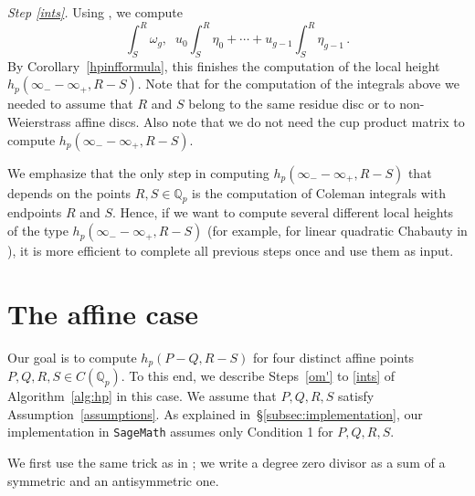 \documentclass[11pt, a4paper]{amsart}
\newcommand{\Q}{\mathbb{Q}}
\theoremstyle{remark}
\numberwithin{equation}{section}
\newcommand{\sg}{{}}
\newcommand{\sm}{{}}
\begin{document}
{\it Step \eqref{ints}.} 
Using \cite{Jen-Even-Degree-CI}, we compute 
\[
\int_S^R \omega_g,\;\; u_0\int_S^R\eta_0+\cdots+u_{g-1}\int_S^R\eta_{g-1}\,.
\]
\sm{By Corollary~\ref{hpinfformula}, this finishes the computation of the
local height $h_p(\infty_- - \infty_+,R-S)$.}
Note that for the computation of the integrals above we needed to assume
that $R$ and $S$ belong to the same residue disc or to \sg{non-Weierstrass} affine discs.
Also note that we do not need the cup product matrix to compute
$h_p(\infty_--\infty_+, R-S)$.



\sm{We emphasize that the only step in computing $h_p(\infty_--\infty_+, R-S)$ that depends on the points $R,S\in\Q_p$ is the computation of Coleman integrals with endpoints $R$ and $S$. Hence, if we want to compute several different local heights of the type $h_p(\infty_--\infty_+, R-S)$ (for example, for linear quadratic Chabauty in \cite{LinQC}), it is more efficient to complete all previous steps once and use them as input.}

\sg{\section{The affine case}\label{sec:affine}}


Our goal is to compute $h_p(P-Q,R-S)$ for four distinct affine points $P,Q,R,S\in
C(\Q_p)$. 
\sm{To this end, we describe Steps~\eqref{om'} to 
\eqref{ints} of Algorithm~\ref{alg:hp} in this case.} 
We assume that $P,Q,R,S$ satisfy \sg{Assumption~\ref{assumptions}}. 
As explained in~\S\ref{subsec:implementation}, our implementation in
\texttt{SageMath} assumes only Condition 1 for $P,Q,R,S$. 

We first use the same trick as in \cite{BBHeights}; we write a degree zero divisor as a sum of a symmetric and an antisymmetric one. 
\end{document}
